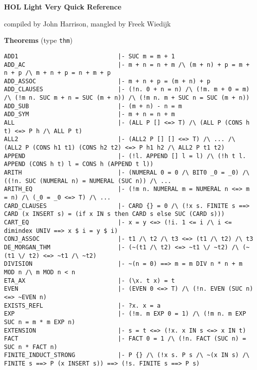 \documentclass{llncs}
\begin{document}
\makeatletter
\let\org@sverb=\@sverb
\def\@sverb{\spaceskip=.3333em\org@sverb}
\makeatother

\parindent=0pt
\sf

\begingroup
\large
\textbf{HOL Light Very Quick Reference}

{compiled by John Harrison, mangled by Freek Wiedijk}
\endgroup

\bigskip
\textbf{Theorems} (type \verb^thm^)

\begingroup
\scriptsize
\begin{verbatim}
ADD1                            |- SUC m = m + 1
ADD_AC                          |- m + n = n + m /\ (m + n) + p = m + n + p /\ m + n + p = n + m + p
ADD_ASSOC                       |- m + n + p = (m + n) + p
ADD_CLAUSES                     |- (!n. 0 + n = n) /\ (!m. m + 0 = m) /\ (!m n. SUC m + n = SUC (m + n)) /\ (!m n. m + SUC n = SUC (m + n))
ADD_SUB                         |- (m + n) - n = m
ADD_SYM                         |- m + n = n + m
ALL                             |- (ALL P [] <=> T) /\ (ALL P (CONS h t) <=> P h /\ ALL P t)
ALL2                            |- (ALL2 P [] [] <=> T) /\ ... /\ (ALL2 P (CONS h1 t1) (CONS h2 t2) <=> P h1 h2 /\ ALL2 P t1 t2)
APPEND                          |- (!l. APPEND [] l = l) /\ (!h t l. APPEND (CONS h t) l = CONS h (APPEND t l))
ARITH                           |- (NUMERAL 0 = 0 /\ BIT0 _0 = _0) /\ ((!n. SUC (NUMERAL n) = NUMERAL (SUC n)) /\ ...
ARITH_EQ                        |- (!m n. NUMERAL m = NUMERAL n <=> m = n) /\ (_0 = _0 <=> T) /\ ...
CARD_CLAUSES                    |- CARD {} = 0 /\ (!x s. FINITE s ==> CARD (x INSERT s) = (if x IN s then CARD s else SUC (CARD s)))
CART_EQ                         |- x = y <=> (!i. 1 <= i /\ i <= dimindex UNIV ==> x $ i = y $ i)
CONJ_ASSOC                      |- t1 /\ t2 /\ t3 <=> (t1 /\ t2) /\ t3
DE_MORGAN_THM                   |- (~(t1 /\ t2) <=> ~t1 \/ ~t2) /\ (~(t1 \/ t2) <=> ~t1 /\ ~t2)
DIVISION                        |- ~(n = 0) ==> m = m DIV n * n + m MOD n /\ m MOD n < n
ETA_AX                          |- (\x. t x) = t
EVEN                            |- (EVEN 0 <=> T) /\ (!n. EVEN (SUC n) <=> ~EVEN n)
EXISTS_REFL                     |- ?x. x = a
EXP                             |- (!m. m EXP 0 = 1) /\ (!m n. m EXP SUC n = m * m EXP n)
EXTENSION                       |- s = t <=> (!x. x IN s <=> x IN t)
FACT                            |- FACT 0 = 1 /\ (!n. FACT (SUC n) = SUC n * FACT n)
FINITE_INDUCT_STRONG            |- P {} /\ (!x s. P s /\ ~(x IN s) /\ FINITE s ==> P (x INSERT s)) ==> (!s. FINITE s ==> P s)

\end{verbatim}
\end{document}
